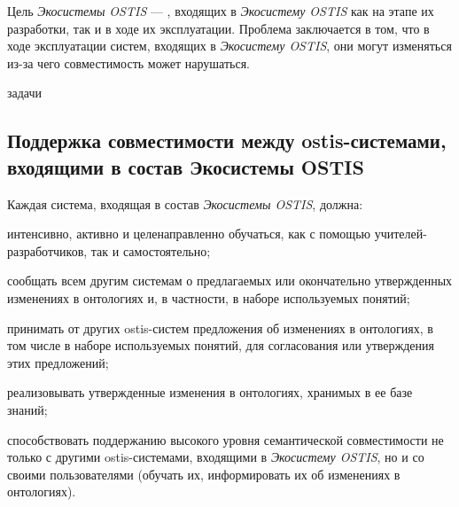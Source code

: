 Цель \textit{Экосистемы OSTIS} --- , входящих в \textit{Экосистему OSTIS} как на этапе их разработки, так и в ходе их эксплуатации. 
Проблема заключается в том, что в ходе эксплуатации систем, входящих в \textit{Экосистему OSTIS}, они могут изменяться из-за чего совместимость может нарушаться. 
\begin{SCn}
    \begin{scnrelfromlistcustom}{задачи}
    \end{scnrelfromlistcustom}
\end{SCn}


\subsection{Поддержка совместимости между ostis-системами, входящими в состав Экосистемы OSTIS}
{\label{sec_ecosystem_interoperability_support}} 

Каждая система, входящая в состав \textit{Экосистемы OSTIS}, должна:
\begin{textitemize}
    \item интенсивно, активно и целенаправленно обучаться, как с помощью учителей-разработчиков, так и самостоятельно;
    \item сообщать всем другим системам о предлагаемых или окончательно утвержденных изменениях в онтологиях и, в частности, в наборе используемых понятий;
    \item принимать от других ostis-систем предложения об изменениях в онтологиях, в том числе в наборе используемых понятий, для согласования или утверждения этих предложений;
    \item реализовывать утвержденные изменения в онтологиях, хранимых в ее базе знаний;
    \item способствовать поддержанию высокого уровня семантической совместимости не только с другими ostis-системами, входящими в \textit{Экосистему OSTIS}, но и со своими пользователями (обучать их, информировать их об изменениях в онтологиях).
\end{textitemize}

